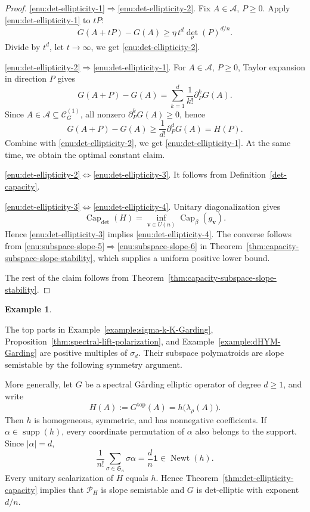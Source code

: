 \documentclass[oneside,english,letterpaper]{amsart}
\numberwithin{equation}{section}
\theoremstyle{plain}
\theoremstyle{definition}
\newtheorem{example}[thm]{Example}
\theoremstyle{remark}
\def\one{\mathbf{1}}
\def\Newt{\operatorname{Newt}}
\def\Capacity{\operatorname{Cap}}
\begin{document}
\begin{proof}
\ref{enu:det-ellipticity-1}$\Rightarrow$\ref{enu:det-ellipticity-2}.
Fix \(A\in\mathcal A\), \(P\ge0\). Apply \ref{enu:det-ellipticity-1} to \(tP\):
\[
G(A+tP)-G(A)\ge \eta\,t^d\det_\rho(P)^{d/n}.
\]
Divide by \(t^d\), let \(t\to\infty\), we get \ref{enu:det-ellipticity-2}.

\ref{enu:det-ellipticity-2}$\Rightarrow$\ref{enu:det-ellipticity-1}.
For \(A\in\mathcal A\), \(P\ge0\), Taylor expansion in direction \(P\) gives
\[
G(A+P)-G(A)=\sum_{k=1}^d \frac{1}{k!}\partial_P^k G(A).
\]
{Since $A\in\mathcal A\subseteq\mathcal C_G^{(1)}$,} all nonzero \(\partial_P^k G(A)\ge0\), hence
\[
G(A+P)-G(A)\ge \frac{1}{d!}\partial_P^d G(A)=H(P).
\]
Combine with \ref{enu:det-ellipticity-2}, we get \ref{enu:det-ellipticity-1}. At the same time, we obtain the optimal constant claim.

\ref{enu:det-ellipticity-2}$\Leftrightarrow$\ref{enu:det-ellipticity-3}. It follows from Definition~\ref{det-capacity}.

\ref{enu:det-ellipticity-3}$\Leftrightarrow$\ref{enu:det-ellipticity-4}.
Unitary diagonalization gives
\[
\Capacity_{\det}(H)
=\inf_{\mathbf v\in U(n)}\Capacity_\beta(g_{\mathbf v}).
\]
Hence \ref{enu:det-ellipticity-3} implies \ref{enu:det-ellipticity-4}.
The converse follows from
\ref{enu:subspace-slope-5}$\Rightarrow$\ref{enu:subspace-slope-6} in
Theorem~\ref{thm:capacity-subspace-slope-stability}, which supplies
a uniform positive lower bound.


The rest of the claim follows from Theorem~\ref{thm:capacity-subspace-slope-stability}.
\end{proof}


\begin{example}
\label{rem:spectral-semistability}

The top parts in Example~\ref{example:sigma-k-K-Garding},
Proposition~\ref{thm:spectral-lift-polarization}, and
Example~\ref{example:dHYM-Garding} are positive multiples of
$\sigma_d$. Their subspace polymatroids are slope semistable
by the following symmetry argument.


More generally, let $G$ be a spectral G{\aa}rding elliptic operator
of degree $d\geq1$, and write
$$
H(A):=G^{\mathrm{top}}(A)=h\bigl(\lambda_\rho(A)\bigr).
$$
Then $h$ is homogeneous, symmetric, and has nonnegative
coefficients. If $\alpha\in\operatorname{supp}(h)$, every
coordinate permutation of $\alpha$ also belongs to the support.
Since $|\alpha|=d$,
$$
\frac{1}{n!}\sum_{\sigma\in\mathfrak S_n}\sigma\alpha
=\frac dn\one\in\Newt(h).
$$
Every unitary scalarization of $H$ equals $h$. Hence
Theorem~\ref{thm:det-ellipticity-capacity} implies that
$\mathcal P_H$ is slope semistable and $G$ is det-elliptic with exponent $d/n$.
\end{example}
\end{document}
